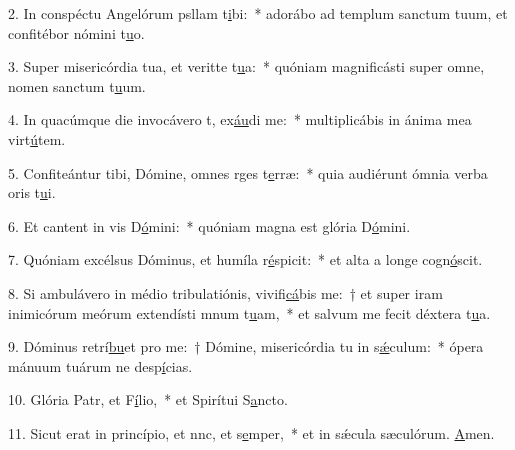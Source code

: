 2. In conspéctu Angelórum psllam t\uline{i}bi:~* adorábo ad templum sanctum tuum, et confitébor nómini t\uline{u}o.\par 
3. Super misericórdia tua, et veritte t\uline{u}a:~* quóniam magnificásti super omne, nomen sanctum t\uline{u}um.\par 
4. In quacúmque die invocávero t, ex\uline{áu}di me:~* multiplicábis in ánima mea virt\uline{ú}tem.\par 
5. Confiteántur tibi, Dómine, omnes rges t\uline{e}rræ:~* quia audiérunt ómnia verba oris t\uline{u}i.\par 
6. Et cantent in vis D\uline{ó}mini:~* quóniam magna est glória D\uline{ó}mini.\par 
7. Quóniam excélsus Dóminus, et humíla r\uline{é}spicit:~* et alta a longe cogn\uline{ó}scit.\par 
8. Si ambulávero in médio tribulatiónis, vivifi\uline{cá}bis me:~† et super iram inimicórum meórum extendísti mnum t\uline{u}am,~* et salvum me fecit déxtera t\uline{u}a.\par 
9. Dóminus retrí\uline{bu}et pro me:~† Dómine, misericórdia tu in s\uline{ǽ}culum:~* ópera mánuum tuárum ne desp\uline{í}cias.\par 
10. Glória Patr, et F\uline{í}lio,~* et Spirítui S\uline{a}ncto.\par 
11. Sicut erat in princípio, et nnc, et s\uline{e}mper,~* et in sǽcula sæculórum. \uline{A}men.\par 
